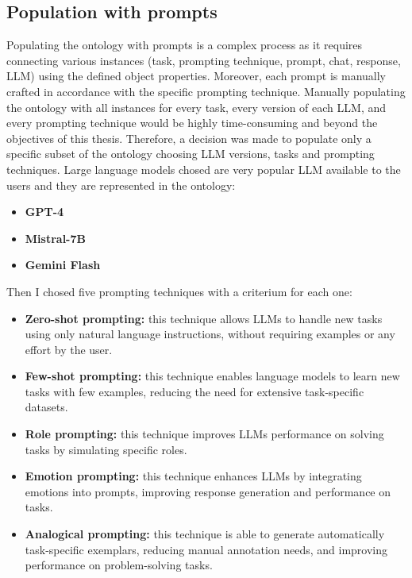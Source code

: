 \subsection{Population with prompts}
\label{subsection:4_3_6_population}
Populating the ontology with prompts is a complex process as it requires connecting various instances (task, prompting technique, prompt, chat, response, LLM) using the defined object properties. Moreover, each prompt is manually crafted in accordance with the specific prompting technique. Manually populating the ontology with all instances for every task, every version of each LLM, and every prompting technique would be highly time-consuming and beyond the objectives of this thesis. Therefore, a decision was made to populate only a specific subset of the ontology choosing LLM versions, tasks and prompting techniques. Large language models chosed are very popular LLM available to the users and they are represented in the ontology:
\begin{itemize}
    \item \textbf{GPT-4}
    \item \textbf{Mistral-7B}
    \item \textbf{Gemini Flash}
\end{itemize}
Then I chosed five prompting techniques with a criterium for each one:
\begin{itemize}
    \item \textbf{Zero-shot prompting:} this technique allows LLMs to handle new tasks using only natural language instructions, without requiring examples or any effort by the user.

    \item \textbf{Few-shot prompting:} this technique  enables language models to learn new tasks with few examples, reducing the need for extensive task-specific datasets.
    
    \item \textbf{Role prompting:} this technique improves LLMs performance on solving tasks by simulating specific roles.

    \item \textbf{Emotion prompting:} this technique enhances LLMs by integrating emotions into prompts, improving response generation and performance on tasks.

    \item \textbf{Analogical prompting:} this technique is able to generate automatically task-specific exemplars, reducing manual annotation needs, and improving performance on problem-solving tasks.
\end{itemize}
